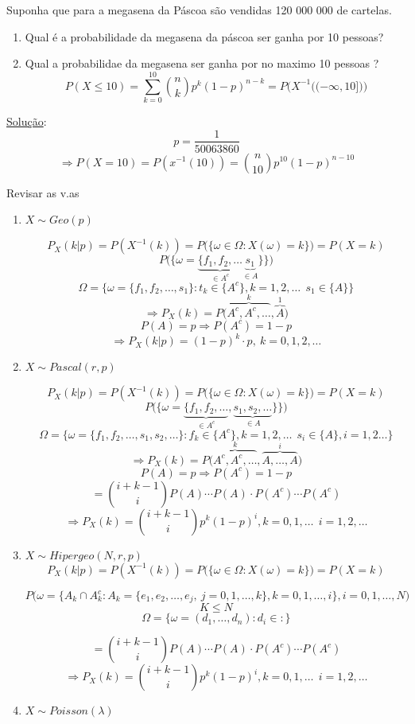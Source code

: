 \documentclass[a4paper,12pt]{article}
\begin{document}
Suponha que para a megasena da Páscoa são vendidas 120 000 000 de cartelas.
\begin{enumerate}[label=\alph*)]
	\item 

 Qual é a probabilidade da megasena da páscoa ser ganha por 10 pessoas?\\
 
 \item 
 Qual a probabilidae da megasena ser ganha por no maximo 10 pessoas ?
 $$P(X\le 10) = \sum\limits_{k=0}^{10} \binom{n}{k} p^k(1-p)^{n-k}= P\bigg( X^{-1}\bigg((-\infty,10 ]\bigg)\bigg) $$
 
\end{enumerate}
\underline{Solução}: 
$$p=\frac{1}{50063860} $$
$$\Rightarrow P(X=10) = P(x^{-1}(10))=\binom{n}{10}p^{10}(1-p)^{n-10} $$


\newpage

Revisar as v.as
\begin{enumerate}
	\item  $X\sim Geo(p) $
	
	$$P_X(k|p)=P(X^{-1}({k}))=P\bigg(\{\omega \in \Omega:X(\omega)=k \}\bigg)=P(X=k)$$
$$P\bigg( \bigg\{\omega =\underbrace{\{f_1,f_2,\ldots}_{\in A^c}\underbrace{s_1}_{\in A} \} \bigg\} \bigg) $$
$$\Omega = \bigg\{ \omega= \{ f_1,f_2,\ldots,s_1\}: t_k \in \{A^c \},k=1,2,\ldots \ \ s_1 \in \{A\} \bigg\}$$
$$\Rightarrow P_X(k)=P\bigg( \overbrace{A^c,A^c,\ldots}^{k},\overbrace{A}^{1} \bigg)  $$
$$P(A)=p \Rightarrow P(A^c)=1-p$$
	$$\Rightarrow P_X(k|p)=(1-p)^{k}\cdot p, \ k=0,1,2,\ldots $$
	
	
	\item $X \sim Pascal (r,p) $
	
	$$P_X(k|p)=P(X^{-1}({k}))=P\bigg(\{\omega \in \Omega:X(\omega)=k \}\bigg)=P(X=k)$$
$$P\bigg( \bigg\{\omega =\underbrace{\{f_1,f_2,\ldots}_{\in A^c},\underbrace{s_1,s_2,\ldots}_{\in A}\} \bigg\} \bigg) $$
$$\Omega = \bigg\{ \omega= \{ f_1,f_2,\ldots,s_1,s_2,\ldots\}: f_k \in \{A^c \},k=1,2,\ldots \ \ s_i \in \{A\},i=1,2\ldots\bigg\}$$
$$\Rightarrow P_X(k)=P\bigg( \overbrace{A^c,A^c,\ldots}^{k},\overbrace{A,\ldots,A}^{i} \bigg)  $$
$$P(A)=p \Rightarrow P(A^c)=1-p$$
$$= \binom{i+k-1}{i}P(A)\cdots P(A)\cdot P(A^c)\cdots P(A^c) $$
$$\Rightarrow P_X(k)= \binom{i+k-1}{i} p^k (1-p)^{i}, k=0,1,\ldots \ \ i=1,2,\ldots$$
	\newpage
	\item $X\sim Hipergeo(N,r,p)$
		$$P_X(k|p)=P(X^{-1}({k}))=P\bigg(\{\omega \in \Omega:X(\omega)=k \}\bigg)=P(X=k)$$
		
		$$P\bigg(\omega=\bigg\{A_k\cap A_k^c:A_k= \{e_1,e_2,\ldots,e_j, \ j=0,1,\ldots,k \}, k=0,1,\ldots,i\bigg\},i=0,1,\ldots,N\bigg) $$
		$$K\le N $$
	$$\Omega = \bigg\{ \omega= (d_1,\ldots,d_n): d_i \in  :  \bigg\}$$
	


	$$= \binom{i+k-1}{i}P(A)\cdots P(A)\cdot P(A^c)\cdots P(A^c) $$
	$$\Rightarrow P_X(k)= \binom{i+k-1}{i} p^k (1-p)^{i}, k=0,1,\ldots \ \ i=1,2,\ldots$$
	
	
	\item $X \sim Poisson(\lambda)$
\end{enumerate}
\end{document}
